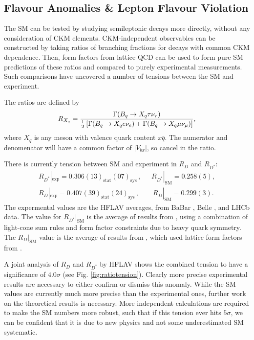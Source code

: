 \subsection{Flavour Anomalies \& Lepton Flavour Violation}

The SM can be tested by studying semileptonic decays more directly, without any consideration of CKM elements. CKM-independent observables can be constructed by taking ratios of branching fractions for decays with common CKM dependence. Then, form factors from lattice QCD can be used to form pure SM predictions of these ratios and compared to purely experimental measurements. Such comparisons have uncovered a number of tensions between the SM and experiment.

The ratios are defined by
\begin{align}
  R_{X_q} = {\Gamma(B_q\to X_q \tau \nu_{\tau}) \over {1\over 2}\left[\Gamma(B_q\to X_q e \nu_e) + \Gamma(B_q\to X_q \mu \nu_{\mu}) \right]},
  \label{eq:Rratios}
\end{align}
where $X_q$ is any meson with valence quark content $x\bar{q}$. The numerator and denomenator will have a common factor of $|V_{bx}|$, so cancel in the ratio.

There is currently tension between SM and experiment in $R_D$ and $R_{D^*}$:
\begin{gather}
  R_{D^*}|_{\text{exp}} = 0.306(13)_{\text{stat}}(07)_{\text{sys}}\,,\quad\,\,\, R_{D^*}|_{\text{SM}} = 0.258(5),
  \\
  R_D|_{\text{exp}} = 0.407(39)_{\text{stat}}(24)_{\text{sys}}\,,\quad\quad R_D|_{\text{SM}} = 0.299(3).
\end{gather}
The expermental values are the HFLAV averages, from BaBar \cite{Lees:2012xj,Lees:2013uzd}, Belle \cite{Huschle:2015rga,Sato:2016svk,Hirose:2016wfn,Hirose:2017dxl}, and LHCb \cite{Aaij:2015yra,Aaij:2017uff,Aaij:2017deq} data. 
The value for $R_{D^*}|_{\text{SM}}$ is the average of results from \cite{Bigi:2016mdz,Bernlochner:2017jka,Jaiswal:2017rve}, using a combination of light-cone sum rules and form factor constraints due to heavy quark symmetry. The $R_{D}|_{\text{SM}}$ value is the average of results from \cite{Bernlochner:2017jka,Bigi:2017jbd,Jaiswal:2017rve}, which used lattice form factors from \cite{Na:2015kha,Lattice:2015rga}.

A joint analysis of $R_D$ and $R_{D^*}$ by HFLAV shows the combined tension to have a significance of $4.0\sigma$ (see Fig. \ref{fig:ratiotension}). Clearly more precise experimental results are necessary to either confirm or dismiss this anomaly. While the SM values are currently much more precise than the experimental ones, further work on the theoretical results is necessary. More independent calculations are required to make the SM numbers more robust, such that if this tension ever hits $5\sigma$, we can be confident that it is due to new physics and not some underestimated SM systematic.

